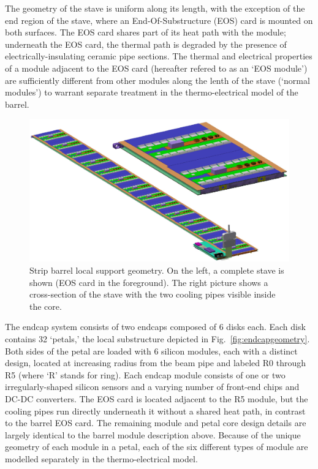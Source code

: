 The geometry of the stave is uniform along its length, with the exception of the end region of the stave, where an End-Of-Substructure (EOS) card is mounted on both surfaces. The EOS card shares part of its heat path with the module; underneath the EOS card, the thermal path is degraded by the presence of electrically-insulating ceramic pipe sections. The thermal and electrical properties of a module adjacent to the EOS card (hereafter refered to as an `EOS module') are sufficiently different from other modules along the lenth of the stave (`normal modules') to warrant separate treatment in the thermo-electrical model of the barrel.

\begin{figure}[ht]
\centering
\includegraphics[width=0.8\linewidth]{figures/stave.pdf}
\caption{Strip barrel local support geometry. On the left, a complete stave is shown (EOS card in the foreground). The right picture shows a cross-section of the stave with the two cooling pipes visible inside the core. }
\label{fig:barrelgeometry}
\end{figure}

The endcap system consists of two endcaps composed of 6 disks each.
Each disk contains 32 `petals,' the local substructure depicted in Fig.~\ref{fig:endcapgeometry}.
Both sides of the petal are loaded with 6 silicon modules, each with a distinct design,
located at increasing radius from the beam pipe and labeled R0 through R5 (where `R' stands for ring).
Each endcap module consists of one
or two irregularly-shaped silicon sensors and a varying number of front-end chips and DC-DC converters.
The EOS card is located adjacent to the R5 module, but the
cooling pipes run directly underneath it without a shared heat path, in contrast to the barrel EOS card.
The remaining module and petal core design details are largely identical to the barrel module description above.
Because of the unique geometry of each module in a petal, each of the six different types of module are
modelled separately in the thermo-electrical model.

